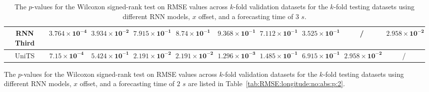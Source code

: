 \begin{table}[!ht]
{\begin{tabular}{|c|c|c|c|c|c|c|c|c|c|}
			RNN Third & $\mathbf{3.764 \times 10^{-4}}$ & $\mathbf{3.934 \times 10^{-2}}$ & $\mathbf{7.915 \times 10^{-1}}$ & $\mathbf{8.74 \times 10^{-1}}$ & $\mathbf{9.368 \times 10^{-1}}$ & $\mathbf{7.112 \times 10^{-1}}$ & $\mathbf{3.525 \times 10^{-1}}$ & / & $\mathbf{2.958 \times 10^{-2}}$ \\ \hline
			UniTS & $\mathbf{7.15 \times 10^{-4}}$ & $\mathbf{5.424 \times 10^{-1}}$ & $\mathbf{2.191 \times 10^{-2}}$ & $\mathbf{2.191 \times 10^{-2}}$ & $\mathbf{1.296 \times 10^{-3}}$ & $\mathbf{1.485 \times 10^{-1}}$ & $\mathbf{6.915 \times 10^{-1}}$ & $\mathbf{2.958 \times 10^{-2}}$ & / \\ \hline
		\end{tabular}
	}
	\caption{The $p$-values for the Wilcoxon signed-rank test on RMSE values across $k$-fold validation datasets for the $k$-fold testing datasets using different RNN models, $x$ offset, and a forecasting time of $3$ $s$.}
	\label{tab:RMSE:longitude:no:abs:p:3}
\end{table}

The $p$-values for the Wilcoxon signed-rank test on RMSE values across $k$-fold validation datasets for the $k$-fold testing datasets using different RNN models, $x$ offset, and a forecasting time of $2$ $s$ are listed in Table~\ref{tab:RMSE:longitude:no:abs:p:2}.

